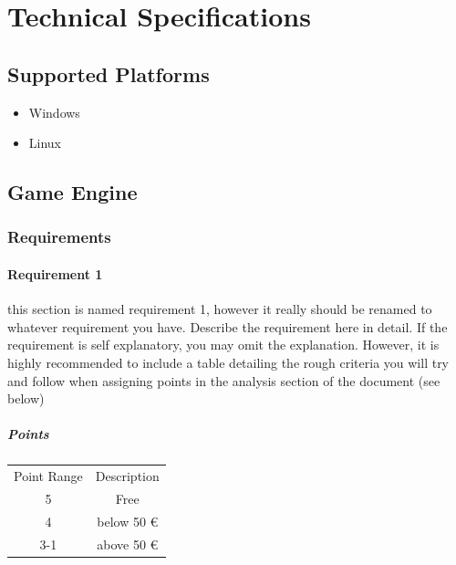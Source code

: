 \documentclass[10pt,a4paper]{article}
\begin{document}
\section{Technical Specifications}

\subsection{Supported Platforms}
\begin{itemize}
\item Windows
\item Linux
\end{itemize}

\subsection{Game Engine}

\subsubsection{Requirements}
\paragraph{Requirement 1}
this section is named requirement 1, however it really should be renamed to whatever requirement you have. Describe the requirement here in detail. If the requirement is self explanatory, you may omit the explanation. However, it is highly recommended to include a table detailing the rough criteria you will try and follow when assigning points in the analysis section of the document (see below)
\subparagraph{Points}
\begin{tabular}{c c}
Point Range & Description\\
5&Free\\
4&below 50 \euro\\
3-1&above 50 \euro
\end{tabular}
\end{document}

